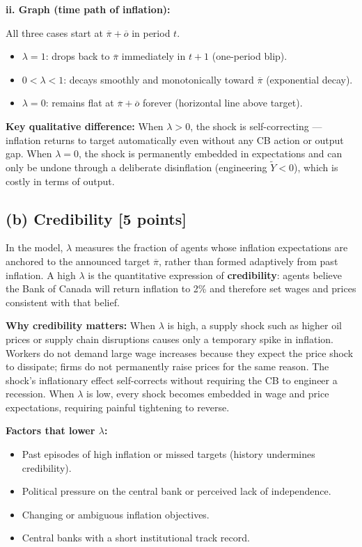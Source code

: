 \documentclass[letterpaper,12pt]{article}
\begin{document}
\noindent\textbf{ii. Graph (time path of inflation):}

All three cases start at $\overline{\pi} + \overline{o}$ in period $t$.

\begin{itemize}
  \item $\lambda = 1$: drops back to $\overline{\pi}$ immediately in $t+1$ (one-period blip).
  \item $0 < \lambda < 1$: decays smoothly and monotonically toward $\overline{\pi}$ (exponential decay).
  \item $\lambda = 0$: remains flat at $\overline{\pi} + \overline{o}$ forever (horizontal line above target).
\end{itemize}

\textbf{Key qualitative difference:} When $\lambda > 0$, the shock is self-correcting --- inflation returns to target automatically even without any CB action or output gap. When $\lambda = 0$, the shock is permanently embedded in expectations and can only be undone through a deliberate disinflation (engineering $\widetilde{Y} < 0$), which is costly in terms of output.

\subsection*{(b) Credibility [5 points]}

In the model, $\lambda$ measures the fraction of agents whose inflation expectations are anchored to the announced target $\overline{\pi}$, rather than formed adaptively from past inflation. A high $\lambda$ is the quantitative expression of \textbf{credibility}: agents believe the Bank of Canada will return inflation to 2\% and therefore set wages and prices consistent with that belief.

\textbf{Why credibility matters:} When $\lambda$ is high, a supply shock such as higher oil prices or supply chain disruptions causes only a temporary spike in inflation. Workers do not demand large wage increases because they expect the price shock to dissipate; firms do not permanently raise prices for the same reason. The shock's inflationary effect self-corrects without requiring the CB to engineer a recession. When $\lambda$ is low, every shock becomes embedded in wage and price expectations, requiring painful tightening to reverse.

\textbf{Factors that lower $\lambda$:}
\begin{itemize}
  \item Past episodes of high inflation or missed targets (history undermines credibility).
  \item Political pressure on the central bank or perceived lack of independence.
  \item Changing or ambiguous inflation objectives.
  \item Central banks with a short institutional track record.
\end{itemize}
\end{document}
